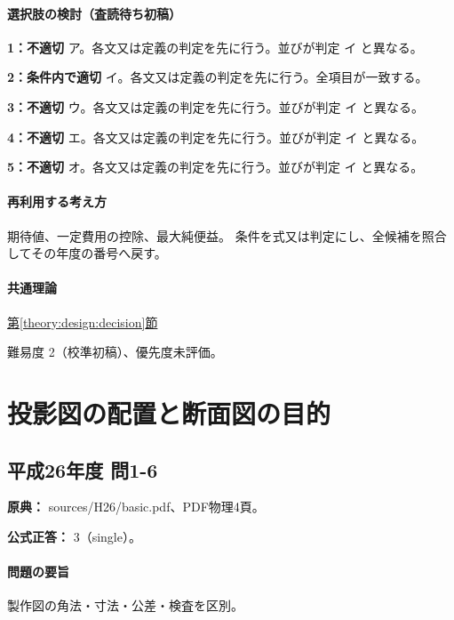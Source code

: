 \paragraph{選択肢の検討（査読待ち初稿）}\mbox{}\par

\noindent\textbf{1：不適切} ア。各文又は定義の判定を先に行う。並びが判定 イ と異なる。\par

\noindent\textbf{2：条件内で適切} イ。各文又は定義の判定を先に行う。全項目が一致する。\par

\noindent\textbf{3：不適切} ウ。各文又は定義の判定を先に行う。並びが判定 イ と異なる。\par

\noindent\textbf{4：不適切} エ。各文又は定義の判定を先に行う。並びが判定 イ と異なる。\par

\noindent\textbf{5：不適切} オ。各文又は定義の判定を先に行う。並びが判定 イ と異なる。\par

\paragraph{再利用する考え方} 期待値、一定費用の控除、最大純便益。 条件を式又は判定にし、全候補を照合してその年度の番号へ戻す。

\paragraph{共通理論} \hyperref[theory:design:decision]{第\ref*{theory:design:decision}節}

\par 難易度 2（校準初稿）、優先度未評価。

\section{投影図の配置と断面図の目的}

\subsection{平成26年度 問1-6}
\label{q:h26-reg-basic-1-6}

\noindent\textbf{原典：} sources/H26/basic.pdf、PDF物理4頁。

\textbf{公式正答：} 3（single）。

\paragraph{問題の要旨} 製作図の角法・寸法・公差・検査を区別。

